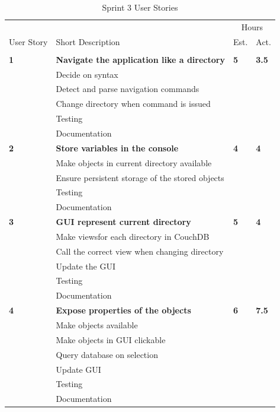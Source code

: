 \begin{table}
\caption{Sprint 3 User Stories}
\centering
\begin{tabular}{ l p{8cm} l l }
\hline 
			&				&\multicolumn{2}{c}{Hours}			\\
 User Story	& Short Description		&Est.		&Act.	                               \\ 
\hline \\ [-2.0ex]
 
\bf{1}     &\bf{Navigate the application like a directory}		&\bf{5}		&\bf{3.5}          \\ 
		  &Decide on syntax						&			&		\\
		  &Detect and parse navigation commands	&			&		\\
		  &Change directory when command is issued&			&		\\
		  &Testing							&			&		\\
		  &Documentation						&			&		\\

 \bf{2}     &\bf{Store variables in the console} 				&\bf{4}		&\bf{4}               \\ 
		  &Make objects in current directory available		&			&		\\
		  &Ensure persistent storage of the stored objects	&			&		\\
		  &Testing								&			&		\\
		  &Documentation							&			&		\\

 \bf{3}     &\bf{GUI represent current directory} 			&\bf{5}		&\bf{4}		     \\ 
		  &Make viewsfor each directory in CouchDB		&			&		\\
		  &Call the correct view when changing directory	&			&		\\
		  &Update the GUI							&			&		\\
		  &Testing								&			&		\\
		  &Documentation							&			&		\\

 \bf{4}   	&\bf{Expose properties of the objects}			&\bf{6}		&\bf{7.5}		     \\ 
		  &Make objects available						&			&		\\
		  &Make objects in GUI clickable				&			&		\\
		  &Query database on selection				&			&		\\
		  &Update GUI								&			&		\\
		  &Testing								&			&		\\
		  &Documentation							&			&		\\


\end{tabular}
\end{table}
